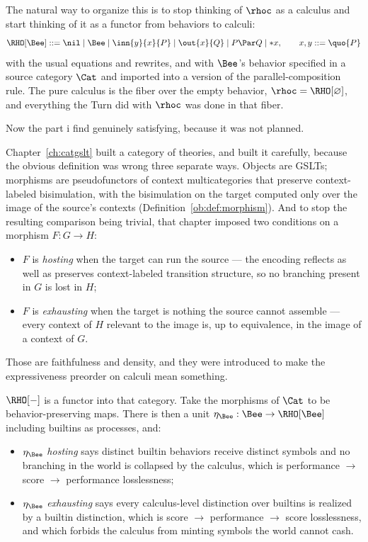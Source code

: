 The natural way to organize this is to stop thinking of $\rhoc$ as
a calculus and start thinking of it as a functor from behaviors to
calculi:
\[
\RHO[\Bee] ::= \nil \mid \Bee \mid \inn{y}{x}{P} \mid \out{x}{Q}
\mid P \Par Q \mid *x,
\qquad x, y ::= \quo{P}
\]
with the usual equations and rewrites, and with $\Bee$'s behavior
specified in a source category $\Cat$ and imported into a version
of the parallel-composition rule.
The pure calculus is the fiber over the empty behavior,
$\rhoc = \RHO[\varnothing]$, and everything the Turn did with
$\rhoc$ was done in that fiber.

Now the part i find genuinely satisfying, because it was not
planned.

Chapter~\ref{ch:catgslt} built a category of theories, and built it
carefully, because the obvious definition was wrong three separate
ways.
Objects are GSLTs; morphisms are pseudofunctors of context
multicategories that preserve context-labeled bisimulation, with
the bisimulation on the target computed only over the image of the
source's contexts (Definition~\ref{ob:def:morphism}).
And to stop the resulting comparison being trivial, that chapter
imposed two conditions on a morphism $F : G \to H$:

\begin{itemize}[leftmargin=1.6em]
\item $F$ is \emph{hosting} when the target can run the source ---
the encoding reflects as well as preserves context-labeled
transition structure, so no branching present in $G$ is lost in
$H$;
\item $F$ is \emph{exhausting} when the target is nothing the
source cannot assemble --- every context of $H$ relevant to the
image is, up to equivalence, in the image of a context of $G$.
\end{itemize}

\noindent
Those are faithfulness and density, and they were introduced to
make the expressiveness preorder on calculi mean something.

$\RHO[-]$ is a functor into that category.
Take the morphisms of $\Cat$ to be behavior-preserving maps.
There is then a unit $\eta_{\Bee} : \Bee \to \RHO[\Bee]$ including
builtins as processes, and:

\begin{itemize}[leftmargin=1.6em]
\item $\eta_{\Bee}$ \emph{hosting} says distinct builtin behaviors
receive distinct symbols and no branching in the world is collapsed
by the calculus, which is performance $\to$ score $\to$ performance
losslessness;
\item $\eta_{\Bee}$ \emph{exhausting} says every calculus-level
distinction over builtins is realized by a builtin distinction,
which is score $\to$ performance $\to$ score losslessness, and
which forbids the calculus from minting symbols the world cannot
cash.
\end{itemize}

